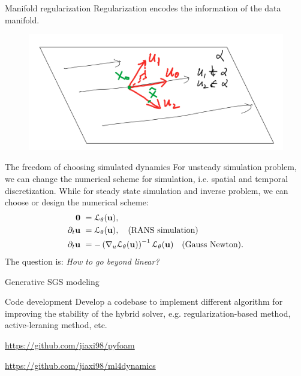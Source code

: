 \documentclass{beamer}
\begin{document}
\begin{frame}{Manifold regularization}
	Regularization encodes the information of the data manifold.
	\begin{figure}[H]
		\centering
		\centerline{\includegraphics[width=0.9\linewidth]{fig/mfd.png}}
	\end{figure}
\end{frame}

\begin{frame}{The freedom of choosing simulated dynamics}
	For unsteady simulation problem, we can change the numerical scheme for simulation, i.e.
	spatial and temporal discretization. While for steady state simulation and inverse problem, we can 
	choose or design the numerical scheme:
	\begin{equation}
		\begin{aligned}
			\mathbf{0} & \ = \mathcal{L}_{\theta}(\mathbf{u}),	\\
		  \partial_t \mathbf{u} & \ = \mathcal{L}_{\theta}(\mathbf{u}), \quad \text{(RANS simulation)}   \\
		  \partial_t \mathbf{u} & \ = - \left( \nabla_u\mathcal{L}_{\theta}(\mathbf{u}) \right)^{-1} \mathcal{L}_{\theta}(\mathbf{u}) \quad \text{(Gauss Newton)}.
		\end{aligned}
	\end{equation}  
	The question is: \textit{How to go beyond linear?}
\end{frame}

\begin{frame}{Generative SGS modeling}
	
\end{frame}



\begin{frame}{Code development}
	Develop a codebase to implement different algorithm for improving the stability
	of the hybrid solver, e.g. regularization-based method, active-leraning method, etc.

	\url{https://github.com/jiaxi98/pyfoam}

	\url{https://github.com/jiaxi98/ml4dynamics}
\end{frame}
\end{document}
